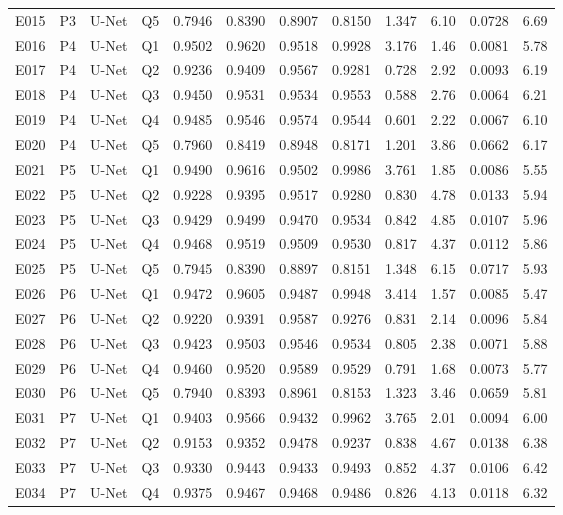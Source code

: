 \begin{longtable}{@{}lllllccccccc@{}}
E015 & P3 & U-Net & Q5 & 0.7946 & 0.8390 & 0.8907 & 0.8150 & 1.347 & 6.10 & 0.0728 & 6.69 \\
E016 & P4 & U-Net & Q1 & 0.9502 & 0.9620 & 0.9518 & 0.9928 & 3.176 & 1.46 & 0.0081 & 5.78 \\
E017 & P4 & U-Net & Q2 & 0.9236 & 0.9409 & 0.9567 & 0.9281 & 0.728 & 2.92 & 0.0093 & 6.19 \\
E018 & P4 & U-Net & Q3 & 0.9450 & 0.9531 & 0.9534 & 0.9553 & 0.588 & 2.76 & 0.0064 & 6.21 \\
E019 & P4 & U-Net & Q4 & 0.9485 & 0.9546 & 0.9574 & 0.9544 & 0.601 & 2.22 & 0.0067 & 6.10 \\
E020 & P4 & U-Net & Q5 & 0.7960 & 0.8419 & 0.8948 & 0.8171 & 1.201 & 3.86 & 0.0662 & 6.17 \\
E021 & P5 & U-Net & Q1 & 0.9490 & 0.9616 & 0.9502 & 0.9986 & 3.761 & 1.85 & 0.0086 & 5.55 \\
E022 & P5 & U-Net & Q2 & 0.9228 & 0.9395 & 0.9517 & 0.9280 & 0.830 & 4.78 & 0.0133 & 5.94 \\
E023 & P5 & U-Net & Q3 & 0.9429 & 0.9499 & 0.9470 & 0.9534 & 0.842 & 4.85 & 0.0107 & 5.96 \\
E024 & P5 & U-Net & Q4 & 0.9468 & 0.9519 & 0.9509 & 0.9530 & 0.817 & 4.37 & 0.0112 & 5.86 \\
E025 & P5 & U-Net & Q5 & 0.7945 & 0.8390 & 0.8897 & 0.8151 & 1.348 & 6.15 & 0.0717 & 5.93 \\
E026 & P6 & U-Net & Q1 & 0.9472 & 0.9605 & 0.9487 & 0.9948 & 3.414 & 1.57 & 0.0085 & 5.47 \\
E027 & P6 & U-Net & Q2 & 0.9220 & 0.9391 & 0.9587 & 0.9276 & 0.831 & 2.14 & 0.0096 & 5.84 \\
E028 & P6 & U-Net & Q3 & 0.9423 & 0.9503 & 0.9546 & 0.9534 & 0.805 & 2.38 & 0.0071 & 5.88 \\
E029 & P6 & U-Net & Q4 & 0.9460 & 0.9520 & 0.9589 & 0.9529 & 0.791 & 1.68 & 0.0073 & 5.77 \\
E030 & P6 & U-Net & Q5 & 0.7940 & 0.8393 & 0.8961 & 0.8153 & 1.323 & 3.46 & 0.0659 & 5.81 \\
E031 & P7 & U-Net & Q1 & 0.9403 & 0.9566 & 0.9432 & 0.9962 & 3.765 & 2.01 & 0.0094 & 6.00 \\
E032 & P7 & U-Net & Q2 & 0.9153 & 0.9352 & 0.9478 & 0.9237 & 0.838 & 4.67 & 0.0138 & 6.38 \\
E033 & P7 & U-Net & Q3 & 0.9330 & 0.9443 & 0.9433 & 0.9493 & 0.852 & 4.37 & 0.0106 & 6.42 \\
E034 & P7 & U-Net & Q4 & 0.9375 & 0.9467 & 0.9468 & 0.9486 & 0.826 & 4.13 & 0.0118 & 6.32 \\

\end{longtable}
